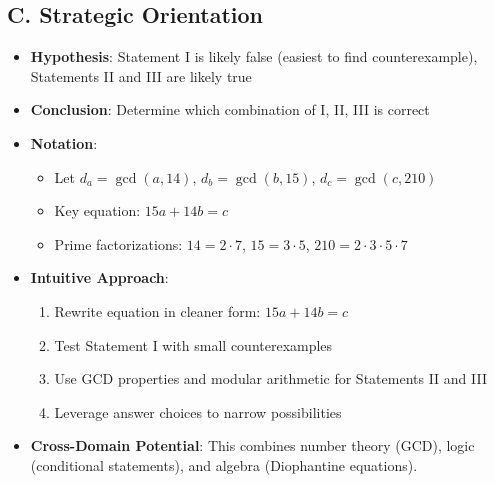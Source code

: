 \documentclass[12pt]{article}
\begin{document}
\begin{problemconfigbox}
\subsection*{C. Strategic Orientation}
\begin{itemize}[leftmargin=*]
    \item \textbf{Hypothesis}: Statement I is likely false (easiest to find counterexample), Statements II and III are likely true
    \item \textbf{Conclusion}: Determine which combination of I, II, III is correct
    \item \textbf{Notation}: 
    \begin{itemize}
        \item Let $d_a = \gcd(a, 14)$, $d_b = \gcd(b, 15)$, $d_c = \gcd(c, 210)$
        \item Key equation: $15a + 14b = c$
        \item Prime factorizations: $14 = 2 \cdot 7$, $15 = 3 \cdot 5$, $210 = 2 \cdot 3 \cdot 5 \cdot 7$
    \end{itemize}
    \item \textbf{Intuitive Approach}: 
    \begin{enumerate}
        \item Rewrite equation in cleaner form: $15a + 14b = c$
        \item Test Statement I with small counterexamples
        \item Use GCD properties and modular arithmetic for Statements II and III
        \item Leverage answer choices to narrow possibilities
    \end{enumerate}
    \item \textbf{Cross-Domain Potential}: This combines number theory (GCD), logic (conditional statements), and algebra (Diophantine equations).
\end{itemize}
\end{problemconfigbox}
\end{document}

